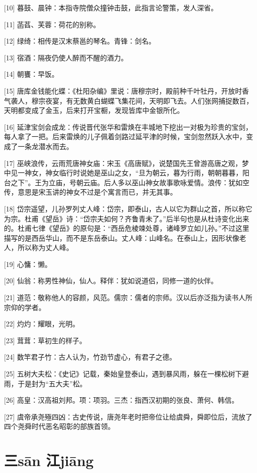 \documentclass[12pt,UTF8]{ctexbook}
\begin{document}
[10] 暮鼓、晨钟：本指寺院僧众撞钟击鼓，此指言论警策，发人深省。

[11] 菡萏、芙蓉：荷花的别称。

[12] 绿绮：相传是汉末蔡邕的琴名。青锋：剑名。

[13] 宿酒：隔夜仍使人醉而不醒的酒力。

[14] 朝饔：早饭。

[15] 唐库金钱能化蝶：《杜阳杂编》里说：唐穆宗时，殿前种千叶牡丹，开放时香气袭人，穆宗夜宴，有无数黄白蝴蝶飞集花间，天明即飞去。人们张网捕捉数百，天明都变成了金玉，后来打开宝橱，发现皆库中金银所化。

[16] 延津宝剑会成龙：传说晋代张华和雷焕在丰城地下挖出一对极为珍贵的宝剑，每人拿了一把。后来雷焕的儿子佩着剑路过延平津的时候，宝剑忽然跃入水中，变成了一条龙潜水而去。

[17] 巫峡浪传，云雨荒唐神女庙：宋玉《高唐赋》，说楚国先王曾游高唐之观，梦中见一神女，神女临行时说她是巫山之女，“旦为朝云，暮为行雨，朝朝暮暮，阳台之下”。王为立庙，号朝云庙。后人多以巫山神女故事歌咏爱情。浪传：犹如空传，意思是宋玉讲的神女不过是个寓言而已，并无其事。

[18] 岱宗遥望，儿孙罗列丈人峰：岱宗，即泰山，古人以它为群山之首，所以称它为宗。杜甫《望岳》诗：“岱宗夫如何？齐鲁青未了。”后半句也是从杜诗变化出来的。杜甫七律《望岳》的原句是：“西岳危棱竦处尊，诸峰罗立如儿孙。”不过这里描写的是西岳华山，而不是东岳泰山。丈人峰：山峰名。在泰山上，因形状像老人，所以称为丈人峰。

[19] 心慵：懒。

[20] 仙翁：称男性神仙，仙人。释伴：犹如说道侣，同修一道的伙伴。

[21] 道范：敬称他人的容颜，风范。儒宗：儒者的宗师。汉以后亦泛指为读书人所宗仰的学者。

[22] 灼灼：耀眼，光明。

[23] 茸茸：草初生的样子。

[24] 数竿君子竹：古人认为，竹劲节虚心，有君子之德。

[25] 五树大夫松：《史记》记载，秦始皇登泰山，遇到暴风雨，躲在一棵松树下避雨，于是封为“五大夫”松。

[26] 高皇：汉高祖刘邦。项：项羽。三杰：指西汉初期的张良、萧何、韩信。

[27] 虞帝承尧殛四凶：古史传说，唐尧年老时把帝位让给虞舜，舜即位后，流放了四个尧舜时代恶名昭彰的部族首领。





\chapter{三sān 江jiāng}
\end{document}
